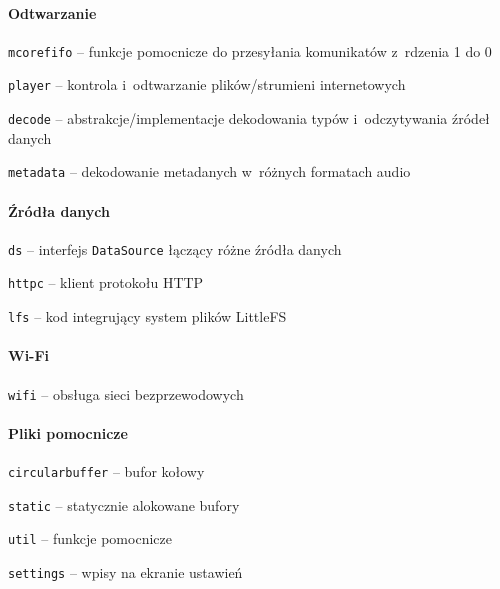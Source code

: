 \documentclass[polish]{aghengthesis}
\let\tempone\itemize
\let\temptwo\enditemize
\renewenvironment{itemize}{\tempone\setlength{\itemsep}{0cm}}{\temptwo}
\begin{document}
			\paragraph{Odtwarzanie}
				\begin{itemize}
					\item \lstinline|mcorefifo| -- funkcje pomocnicze do przesyłania komunikatów z~rdzenia 1 do 0
					\item \lstinline|player| -- kontrola i~odtwarzanie plików/strumieni internetowych
					\begin{itemize}
						\item \lstinline|decode| -- abstrakcje/implementacje dekodowania typów i~odczytywania źródeł danych
						\item \lstinline|metadata| -- dekodowanie metadanych w~różnych formatach audio
					\end{itemize}
				\end{itemize}
		
			\paragraph{Źródła danych}
				\begin{itemize}
					\item \lstinline|ds| -- interfejs \lstinline|DataSource| łączący różne źródła danych
					\item \lstinline|httpc| -- klient protokołu HTTP
					\item \lstinline|lfs| -- kod integrujący system plików LittleFS\textsuperscript{\cite{littlefs}}
				\end{itemize}
			
			\paragraph{Wi-Fi}
				\begin{itemize}
					\item \lstinline|wifi| -- obsługa sieci bezprzewodowych
				\end{itemize}
		
			\paragraph{Pliki pomocnicze}
				\begin{itemize}
					\item \lstinline|circularbuffer| -- bufor kołowy
					\item \lstinline|static| -- statycznie alokowane bufory
					\item \lstinline|util| -- funkcje pomocnicze
					\item \lstinline|settings| -- wpisy na ekranie ustawień
				\end{itemize}
	
\end{document}
